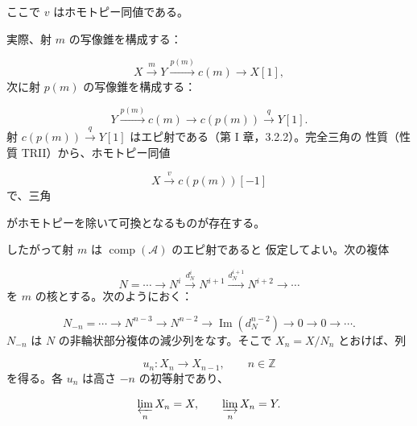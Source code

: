\clearpage
{}%
\begingroup\small\setlength{\parskip}{0pt}\setlength{\emergencystretch}{1.5em}
\setlength{\abovedisplayskip}{4pt plus 2pt minus 2pt}%
\setlength{\belowdisplayskip}{4pt plus 2pt minus 2pt}%

ここで $v$ はホモトピー同値である。

実際、射 $m$ の写像錐を構成する：

\[
X\xrightarrow{m}Y\xrightarrow{p(m)}c(m)\longrightarrow X[1],
\]
次に射 $p(m)$ の写像錐を構成する：

\[
Y\xrightarrow{p(m)}c(m)\longrightarrow c(p(m))
\xrightarrow{q}Y[1].
\]
射 $c(p(m))\xrightarrow{q}Y[1]$ はエピ射である（第 I 章，3.2.2）。完全三角の
性質（性質 TRII）から、ホモトピー同値

\[
X\xrightarrow{v}c(p(m))[-1]
\]
で、三角

\begin{center}
\end{center}
がホモトピーを除いて可換となるものが存在する。

したがって射 $m$ は $\operatorname{comp}(\mathcal A)$ のエピ射であると
仮定してよい。次の複体

\[
N=\cdots\longrightarrow N^i\xrightarrow{d_N^i}N^{i+1}
\xrightarrow{d_N^{i+1}}N^{i+2}\longrightarrow\cdots
\]
を $m$ の核とする。次のようにおく：

\[
N_{-n}=\cdots\longrightarrow N^{n-3}\longrightarrow N^{n-2}
\longrightarrow\operatorname{Im}(d_N^{n-2})
\longrightarrow0\longrightarrow0\longrightarrow\cdots.
\]
$N_{-n}$ は $N$ の非輪状部分複体の減少列をなす。そこで
$X_n=X/N_n$ とおけば、列

\[
u_n\colon X_n\longrightarrow X_{n-1},\qquad n\in\mathbb Z
\]
を得る。各 $u_n$ は高さ $-n$ の初等射であり、

\[
\varprojlim_n X_n=X,
\qquad
\varinjlim_n X_n=Y.
\]
\endgroup
